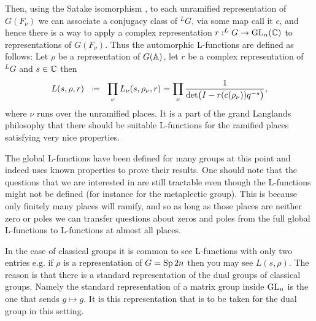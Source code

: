Then, using the Satake isomorphism \cite[2.2]{shahidiEisensteinSeriesAutomorphic2010}, to each unramified representation of \(G(F_\nu)\) we can associate a conjugacy class of \(^LG\), via some map call it \(c\), and hence there is a way to apply a complex representation \(r: ^LG \to \GL_n(\C)\) to representations of \(G(F_\nu)\). Thus the automorphic L-functions are defined as follows: Let \(\rho\) be a representation of \(G(\A)\), let \(r\) be a complex representation of \(^LG\) and \(s\in \C\) then 
\[L(s, \rho, r) \defeq \prod_\nu L_\nu(s, \rho_\nu, r ) = \prod_\nu \frac{1}{\det\bigl( I - r(c(\rho_\nu))q^{-s} \bigr)}  ,\]
where \(\nu\) runs over the unramified places. It is a part of the grand Langlands philosophy that there should be suitable L-functions for the ramified places satisfying very nice properties.

\begin{remark}
	The global L-functions have been defined for many groups at this point and indeed \cite{jiangPolesCertainResidual2013} uses known properties to prove their results. One should note that the questions that we are interested in are still tractable even though the L-functions might not be defined (for instance for the metaplectic group). This is because only finitely many places will ramify, and so as long as those places are neither zero or poles we can transfer questions about zeros and poles from the full global L-functions to L-functions at almost all places. 
\end{remark}

\begin{example}
	In the case of classical groups it is common to see L-functions with only two entries e.g. if \(\rho\) is a representation of \(G = \operatorname{Sp}{2n}\) then you may see 
	\(L(s, \rho).\)
	The reason is that there is a standard representation of the dual groups of classical groups. Namely the standard representation of a matrix group inside \(\operatorname{GL}_n\) is the one that sends \(g\mapsto g\). It is this representation that is to be taken for the dual group in this setting.
\end{example}


